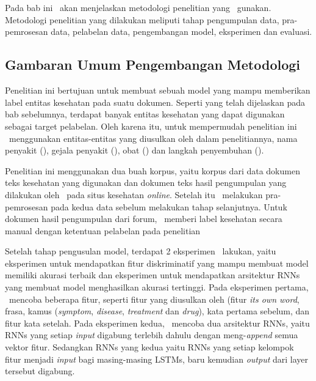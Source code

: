 \chapter{\babTiga}\label{bab:tiga}
Pada bab ini \saya~akan menjelaskan metodologi penelitian yang \saya~gunakan. Metodologi penelitian yang dilakukan meliputi tahap pengumpulan data, pra-pemrosesan data, pelabelan data, pengembangan model, eksperimen dan evaluasi.

\section{Gambaran Umum Pengembangan Metodologi}
Penelitian ini bertujuan untuk membuat sebuah model yang mampu memberikan label entitas kesehatan pada suatu dokumen. Seperti yang telah dijelaskan pada bab sebelumnya, terdapat banyak entitas kesehatan yang dapat digunakan sebagai target pelabelan. Oleh karena itu, untuk mempermudah penelitian ini \saya~menggunakan entitas-entitas yang diusulkan oleh \cite{skripsiKakRadit} dalam penelitiannya,  nama penyakit (\textit{\disease}), gejala penyakit (\textit{\symptom}), obat (\textit{\drug}) dan langkah penyembuhan (\textit{\treatment}).

Penelitian ini menggunakan dua buah korpus, yaitu korpus dari data dokumen teks kesehatan yang digunakan \cite{skripsiKakRadit} dan dokumen teks hasil pengumpulan yang dilakukan oleh \saya~pada situs kesehatan \textit{online}. Setelah itu \saya~melakukan pra-pemrosesan pada kedua data sebelum melakukan tahap selanjutnya. Untuk dokumen hasil pengumpulan dari forum, \saya~memberi label kesehatan secara manual dengan ketentuan pelabelan pada penelitian \cite{skripsiKakRadit}

Setelah tahap pengusulan model, terdapat 2 eksperimen \saya~lakukan, yaitu eksperimen untuk mendapatkan fitur diskriminatif yang mampu membuat model memiliki akurasi terbaik dan eksperimen untuk mendapatkan arsitektur RNNs yang membuat model menghasilkan akurasi tertinggi. Pada eksperimen pertama, \saya~mencoba beberapa fitur, seperti fitur yang diusulkan oleh \cite{skripsiKakRadit} (fitur \textit{its own word}, frasa, kamus (\textit{symptom}, \textit{disease}, \textit{treatment} dan \textit{drug}), kata pertama sebelum, dan fitur kata setelah. Pada eksperimen kedua, \saya~mencoba dua arsitektur RNNs, yaitu RNNs yang setiap \textit{input} digabung terlebih dahulu dengan meng-\textit{append} semua vektor fitur. Sedangkan RNNs yang kedua yaitu RNNs yang setiap kelompok fitur menjadi \textit{input} bagi masing-masing LSTMs, baru kemudian \textit{output} dari layer tersebut digabung.

